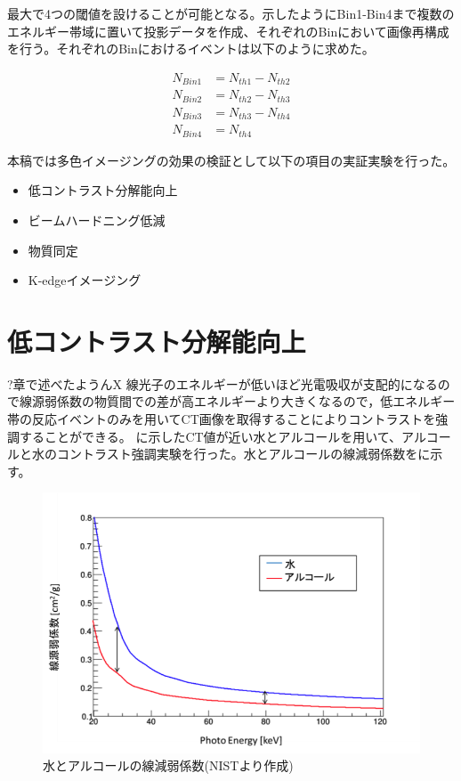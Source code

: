 最大で4つの閾値を設けることが可能となる。示したようにBin1-Bin4まで複数のエネルギー帯域に置いて投影データを作成、それぞれのBinにおいて画像再構成を行う。それぞれのBinにおけるイベントは以下のように求めた。

\begin{align}
N_{Bin1}&=N_{th1}-N_{th2}\\
N_{Bin2}&=N_{th2}-N_{th3}\\
N_{Bin3}&=N_{th3}-N_{th4}\\
N_{Bin4}&=N_{th4}
\end{align}


本稿では多色イメージングの効果の検証として以下の項目の実証実験を行った。

\begin{itemize}
\item 低コントラスト分解能向上
\item ビームハードニング低減
\item 物質同定
\item K-edgeイメージング
\end{itemize}


\section{低コントラスト分解能向上}
?章で述べたようんX 線光子のエネルギーが低いほど光電吸収が支配的になるので線源弱係数の物質間での差が高エネルギーより大きくなるので，低エネルギー帯の反応イベントのみを用いてCT画像を取得することによりコントラストを強調することができる。
に示したCT値が近い水とアルコールを用いて、アルコールと水のコントラスト強調実験を行った。水とアルコールの線減弱係数をに示す。

\begin{figure}[H]
 \begin{center}
 \includegraphics[bb=0.000000 0.000000 344.611512 237.580360,width=0.8\hsize]{image2/chapter5/water_alchol.png} 
 \end{center}
 \caption{水とアルコールの線減弱係数(NISTより作成)}
 \label{fig:water_alchol}
\end{figure}

